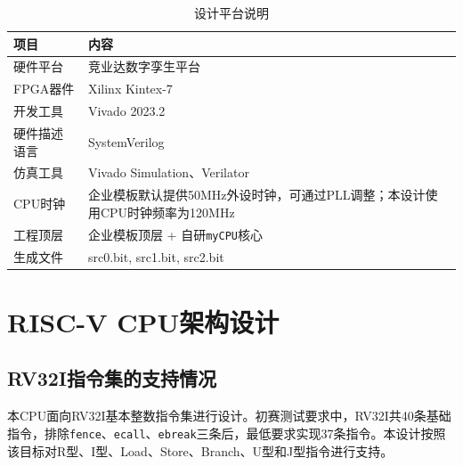 \documentclass[12pt,a4paper]{ctexart}
\newcommand{\code}[1]{\texttt{#1}}
\begin{document}
\begin{table}[H]
	\centering
	\caption{设计平台说明}
	\begin{tabularx}{\textwidth}{p{4cm}X}
		\toprule
		项目     & 内容                                               \\
		\midrule
		硬件平台   & {竞业达数字孪生平台}                                      \\
		FPGA器件 & {Xilinx Kintex-7}                                \\
		开发工具   & {Vivado 2023.2}                                  \\
		硬件描述语言 & SystemVerilog                                    \\
		仿真工具   & {Vivado Simulation、Verilator}                    \\
		CPU时钟  & 企业模板默认提供50MHz外设时钟，可通过PLL调整；本设计使用CPU时钟频率为{120MHz} \\
		工程顶层   & 企业模板顶层 + 自研\code{myCPU}核心                        \\
		生成文件   & {src0.bit, src1.bit, src2.bit}                   \\
		\bottomrule
	\end{tabularx}
\end{table}

\section{RISC-V CPU架构设计}

\subsection{RV32I指令集的支持情况}

本CPU面向RV32I基本整数指令集进行设计。初赛测试要求中，RV32I共40条基础指令，排除\code{fence}、\code{ecall}、\code{ebreak}三条后，最低要求实现37条指令。本设计按照该目标对R型、I型、Load、Store、Branch、U型和J型指令进行支持。
\end{document}
